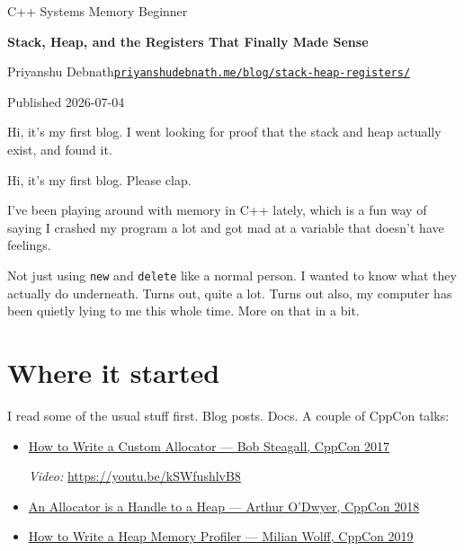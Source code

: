 \documentclass[11pt,a4paper]{article}
\begin{document}
\thispagestyle{plain}
\begin{flushleft}
{\footnotesize\ttfamily\color{muted} C++ \textperiodcentered{} Systems \textperiodcentered{} Memory \textperiodcentered{} Beginner}\par\smallskip
{\LARGE\bfseries\color{ink} Stack, Heap, and the Registers That Finally Made Sense\par}
\medskip
{\small Priyanshu Debnath\quad\textperiodcentered\quad \href{https://priyanshudebnath.me/blog/stack-heap-registers/}{\texttt{priyanshudebnath.me/blog/stack-heap-registers/}}}\par
{\small\color{muted} Published 2026-07-04}\par
\end{flushleft}
\begin{quotebox}
Hi, it's my first blog. I went looking for proof that the stack and heap actually exist, and found it.
\end{quotebox}
\noindent{\color{rule}\rule{\linewidth}{0.5pt}}

Hi, it's my first blog. Please clap.

I've been playing around with memory in C++ lately, which is a fun way of saying I crashed my program a lot and got mad at a variable that doesn't have feelings.

Not just using \texttt{new} and \texttt{delete} like a normal person. I wanted to know what they actually do underneath. Turns out, quite a lot. Turns out also, my computer has been quietly lying to me this whole time. More on that in a bit.

\section{Where it started}

I read some of the usual stuff first. Blog posts. Docs. A couple of CppCon talks:

\begin{itemize}
\item \href{https://www.youtube.com/watch?v=kSWfushlvB8}{How to Write a Custom Allocator --- Bob Steagall, CppCon 2017}

\noindent\textit{Video:} \url{https://youtu.be/kSWfushlvB8}
\item \href{https://www.youtube.com/watch?v=IejdKidUwIg}{An Allocator is a Handle to a Heap --- Arthur O'Dwyer, CppCon 2018}
\item \href{https://www.youtube.com/watch?v=YB0QoWI-g8E}{How to Write a Heap Memory Profiler --- Milian Wolff, CppCon 2019}
\end{itemize}
\end{document}
